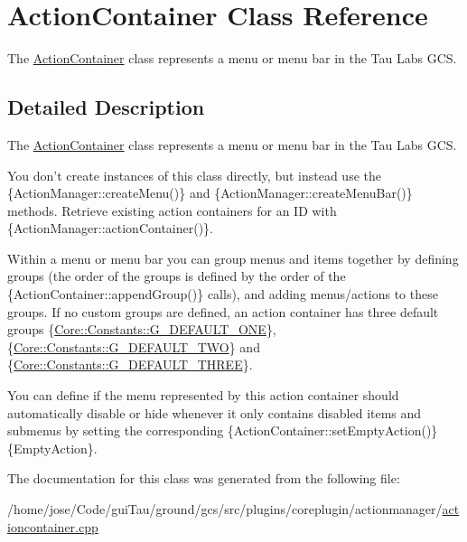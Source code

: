\hypertarget{class_action_container}{\section{Action\-Container Class Reference}
\label{class_action_container}
}


The \hyperlink{class_action_container}{Action\-Container} class represents a menu or menu bar in the Tau Labs G\-C\-S.  




\subsection{Detailed Description}
The \hyperlink{class_action_container}{Action\-Container} class represents a menu or menu bar in the Tau Labs G\-C\-S. 

You don't create instances of this class directly, but instead use the \{Action\-Manager\-::create\-Menu()\} and \{Action\-Manager\-::create\-Menu\-Bar()\} methods. Retrieve existing action containers for an I\-D with \{Action\-Manager\-::action\-Container()\}.

Within a menu or menu bar you can group menus and items together by defining groups (the order of the groups is defined by the order of the \{Action\-Container\-::append\-Group()\} calls), and adding menus/actions to these groups. If no custom groups are defined, an action container has three default groups {\ttfamily }\{\hyperlink{group___core_plugin_ga522e575966eb8fe2374da35aac3e7d69}{Core\-::\-Constants\-::\-G\-\_\-\-D\-E\-F\-A\-U\-L\-T\-\_\-\-O\-N\-E}\}, {\ttfamily }\{\hyperlink{group___core_plugin_ga4f77e1e87898edaae0fa296fdab5806d}{Core\-::\-Constants\-::\-G\-\_\-\-D\-E\-F\-A\-U\-L\-T\-\_\-\-T\-W\-O}\} and {\ttfamily }\{\hyperlink{group___core_plugin_gaa9d110a5d72f47a9f4893a54bebdef9d}{Core\-::\-Constants\-::\-G\-\_\-\-D\-E\-F\-A\-U\-L\-T\-\_\-\-T\-H\-R\-E\-E}\}.

You can define if the menu represented by this action container should automatically disable or hide whenever it only contains disabled items and submenus by setting the corresponding \{Action\-Container\-::set\-Empty\-Action()\}\{Empty\-Action\}. 

The documentation for this class was generated from the following file\-:\begin{DoxyCompactItemize}
\item 
/home/jose/\-Code/gui\-Tau/ground/gcs/src/plugins/coreplugin/actionmanager/\hyperlink{actioncontainer_8cpp}{actioncontainer.\-cpp}\end{DoxyCompactItemize}
